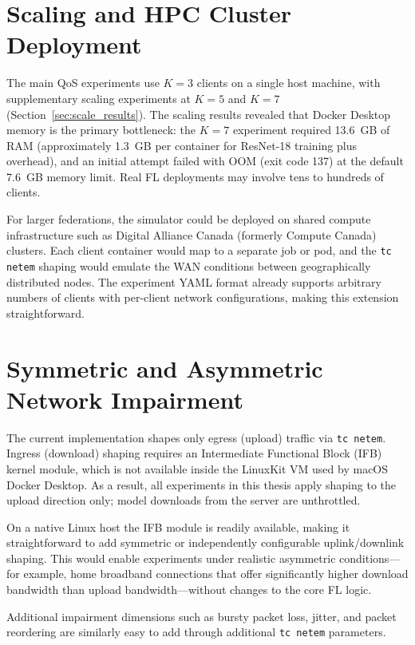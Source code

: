 \documentclass[12pt,a4paper]{report}
\begin{document}
\section{Scaling and HPC Cluster Deployment}

The main QoS experiments use $K = 3$ clients on a single host machine,
with supplementary scaling experiments at $K = 5$ and $K = 7$
(Section~\ref{sec:scale_results}).  The scaling results revealed that
Docker Desktop memory is the primary bottleneck: the $K = 7$ experiment
required 13.6~GB of RAM (approximately 1.3~GB per container for
ResNet-18 training plus overhead), and an initial attempt failed with
OOM (exit code 137) at the default 7.6~GB memory limit.  Real FL
deployments may involve tens to hundreds of clients.

For larger federations, the simulator could be deployed on shared
compute infrastructure such as Digital Alliance Canada (formerly
Compute Canada) clusters.  Each client container would map to a
separate job or pod, and the \texttt{tc netem} shaping would emulate
the WAN conditions between geographically distributed nodes.  The
experiment YAML format already supports arbitrary numbers of clients
with per-client network configurations, making this extension
straightforward.

\section{Symmetric and Asymmetric Network Impairment}

The current implementation shapes only egress (upload) traffic via \texttt{tc netem}.
Ingress (download) shaping requires an Intermediate Functional Block (IFB) kernel
module, which is not available inside the LinuxKit VM used by macOS Docker Desktop.
As a result, all experiments in this thesis apply shaping to the upload direction
only; model downloads from the server are unthrottled.

On a native Linux host the IFB module is readily available, making it
straightforward to add symmetric or independently configurable uplink/downlink
shaping.  This would enable experiments under realistic asymmetric conditions---for
example, home broadband connections that offer significantly higher download
bandwidth than upload bandwidth---without changes to the core FL logic.

Additional impairment dimensions such as bursty packet loss, jitter, and
packet reordering are similarly easy to add through additional \texttt{tc netem}
parameters.
\end{document}
